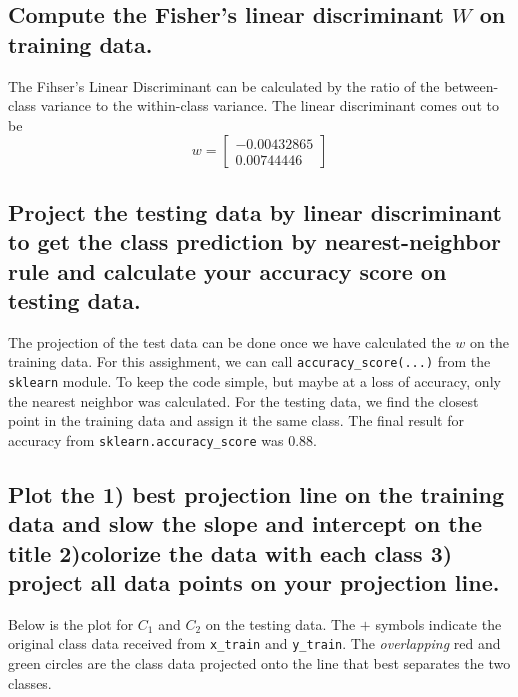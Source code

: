\documentclass{article}
\begin{document}
	\subsection{Compute the Fisher's linear discriminant $W$ on training data.}
		The Fihser's Linear Discriminant can be calculated by the ratio of the between-class
		variance to the within-class variance. The linear discriminant comes out to be 
		\begin{equation*}
			w = 
			\begin{bmatrix}
				-0.00432865 \\
				0.00744446
			\end{bmatrix}
		\end{equation*}
	\subsection{Project the testing data by linear discriminant to get the class prediction by
		nearest-neighbor rule and calculate your accuracy score on testing data.}
		The projection of the test data can be done once we have calculated the $w$ on the training
		data. For this assighment, we can call \texttt{accuracy\_score(...)} from the \texttt{sklearn}
		module.  To keep the code simple, but maybe at a loss of accuracy, only the nearest neighbor
		was calculated. For the testing data, we find the closest point in the training data and 
		assign it the same class. The final result for accuracy from \texttt{sklearn.accuracy\_score}
		was $0.88$.
	\subsection{Plot the \textbf{1) best projection line} on the training data and slow the slope
		and intercept on the title \textbf{2)colorize the data} with each class \textbf{3) project
		all data points on your projection line}.}
		Below is the plot for $C_{1}$ and $C_{2}$ on the testing data. The $+$ symbols indicate the original
		class data received from \texttt{x\_train} and \texttt{y\_train}. The \textit{overlapping} red and
		green circles are the class data projected onto the line that best separates the two classes. 
\end{document}

